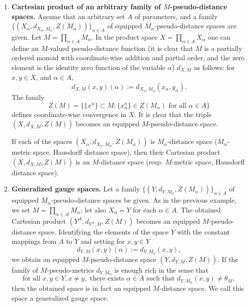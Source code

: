 \documentclass[12pt]{amsart}          %
\begin{document}
\begin{enumerate}[wide]
Another distance function can be defined as
$$
    d^m_{X^m,M^m}((x_1,\ldots,x_m),(y_1,\ldots,y_m))
    =
    (d_{X,M}(x_1,y_1),\ldots,d_{X,M}(x_m,y_m)).
$$
Here $M^m$ is a monoid with coordinate-wise addition and order,  and $$Z(M^m) = \left\{\{(x_1^n,x_2^n,\ldots, x_m^n)\}\colon \{x_1^n\},\ldots, \{x_m^n\}\in Z(M)\right\}.$$
    
\item {\bf Cartesian product of  an arbitrary family of $M$-pseudo-distance spaces.}\label{ex::infiniteProduct} Assume that an arbitrary set $A$ of parameters, and a family $\{ (X_\alpha, d_{X_\alpha,M_\alpha}, Z(M_\alpha))\}_{\alpha\in A}$ of equipped $M_\alpha$-pseudo-distance spaces are given. Let $M =  \prod_{\alpha\in A} M_\alpha$. In the product space $X = \prod_{\alpha\in A} X_\alpha$ one can define an $M$-valued pseudo-distance function  (it is clear that $M$ is a partially ordered monoid with coordinate-wise addition and partial order, and the zero element is the identity zero function of the variable $\alpha$) $d_{X,M}$ as follows: for $x,y\in X$, and $\alpha\in A$, 
$$
d_{X,M}(x,y)(\alpha) := d_{X_\alpha,M_\alpha}(x_\alpha, y_\alpha).
$$
The family 
$$Z(M) = \{\{x^n\}\subset M\colon \{x^n_\alpha\}\in Z(M_\alpha)\text{ for all } \alpha\in A\}$$ defines coordinate-wise convergence in $X$.  It is clear that the triple $(X,d_{X,M},Z(M))$ becomes an equipped  $M$-pseudo-distance space. 

 If each of the spaces $ (X_\alpha, d_{X_\alpha,M_\alpha},Z(M_\alpha))$ is $M_\alpha$-distance space ($M_\alpha$-metric space, Hausdorff distance space), then their Cartesian product $(X,d_{X,M},Z(M))$ is an $M$-distance space (resp. $M$-metric space, Hausdorff distance space).


\item {\bf Generalized gauge spaces.}\label{ex::gaugeSpaces}
 Let a family $\{(Y,d_{Y,M_\alpha}, Z(M_\alpha))\}_{\alpha\in A}$ of equipped  $M_\alpha$-pseudo-distance spaces be given. As in the previous example, we set $M=\prod_{\alpha\in\mathcal{A}}M_\alpha$;  let also $X_\alpha =Y$ for each $\alpha\in A$. The obtained Cartesian product $(Y^A, d_{Y^A,M},Z(M))$ becomes an equipped $M$-pseudo-distance space. Identifying the elements of the space  $Y$ with the constant mappings from $A$ to $Y$ and setting for  $x,y\in Y$
 $$
d_{Y,M}(x,y)(\alpha) := d_{Y,M_\alpha}(x, y),
 $$
 we obtain an equipped $M$-pseudo-distance space $(Y, d_{Y,M},Z(M))$. If the family of $M$-pseudo-metrics $d_{Y,M_\alpha}$ is enough rich in the sense that   
 \begin{equation}\label{familyOfPseudoMetricsIsRich}
   \text {for all } x,y\in Y,  x\neq y,\text{ there exists } \alpha\in A\text{ such that } d_{Y,M_\alpha}(x,y)\neq \theta_M,
  \end{equation}
 then the obtained space is in fact an equipped $M$-distance space. We call this space a generalized  gauge space.
 

\end{enumerate}
\end{document}
